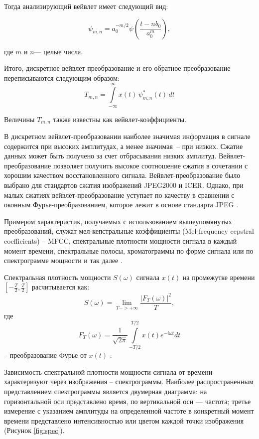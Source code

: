 Тогда анализирующий вейвлет имеет следующий вид:

\begin{equation}
	\psi _{{m,n}}=a_{0}^{{-m/2}}\psi \left({\frac {t-nb_{0}}{a_{0}^{m}}}\right),
\end{equation}

где $m$ и $n$— целые числа.

Итого, дискретное вейвлет-преобразование и его обратное преобразование переписываются следующим образом:
\begin{equation}
	T_{{m,n}}=\int \limits _{{-\infty }}^{{\infty }}x(t)\,\psi _{{m,n}}^{*}(t)\,dt
\end{equation}

Величины $T_{{m,n}}$ также известны как вейвлет-коэффициенты.

В дискретном вейвлет-преобразовании наиболее значимая информация в сигнале содержится при высоких амплитудах, а менее значимая -- при низких.
Сжатие данных может быть получено за счет отбрасывания низких амплитуд.
Вейвлет-преобразование позволяет получить высокое соотношение сжатия в сочетании с хорошим качеством восстановленного сигнала. 
Вейвлет-преобразование было выбрано для стандартов сжатия изображений JPEG2000 и ICER.
Однако, при малых сжатиях вейвлет-преобразование уступает по качеству в сравнении с оконным Фурье-преобразованием, которое лежит в основе стандарта JPEG \cite{wavelet}. 

Примером характеристик, получаемых с использованием вышеупомянутых преобразований, служат мел-кепстральные коэффициенты (Mel-frequency cepstral coefficients) -- MFCC,
спектральные плотности мощности сигнала в каждый момент времени, 
спектральные полосы, хроматограммы по форме сигнала или по спектрограмме мощности и так далее \cite{mus_zhao}.

Спектральная плотность мощности $S(\omega)$ сигнала $x(t)$ на промежутке времени $\left[-\frac{T}{2},\frac{T}{2}\right]$ расчитывается как:
\begin{equation}
	S(\omega) = \lim_{T->+\infty} \frac{\left|F_T(\omega)\right|^2}{T},
\end{equation}
где
\begin{equation}
	F_{T}(\omega )={\frac {1}{\sqrt {2\pi }}}\int \limits _{-T/2}^{T/2}x(t)e^{-i\omega t} dt
\end{equation}
-- преобразование Фурье	от $x(t)$ \cite{otnes}.

Зависимость спектральной плотности мощности сигнала от времени характеризуют через изображения -- спектрограммы.
Наиболее распространенным представлением спектрограммы является двумерная диаграмма: на горизонтальной оси представлено время, 
по вертикальной оси — частота; третье измерение с указанием амплитуды на определенной частоте в конкретный момент времени представлено 
интенсивностью или цветом каждой точки изображения (Рисунок \ref{fig:spec}).

